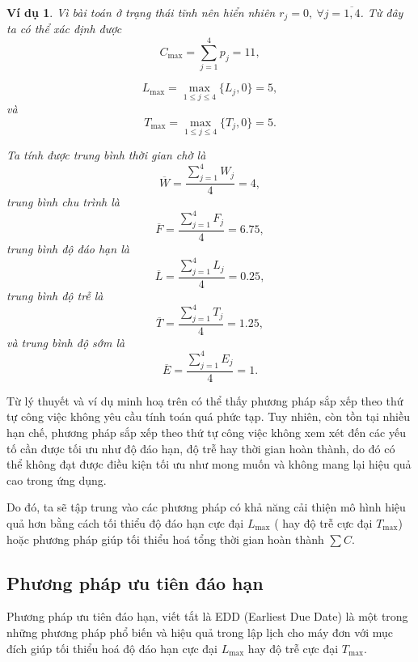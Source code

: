 \documentclass[12pt,a4paper]{report}
\newtheorem{vd}{Ví dụ}
\begin{document}
\begin{vd}
Vì bài toán ở trạng thái tĩnh nên hiển nhiên $r_j = 0, \: \forall j=\overline{1,4}$. Từ đây ta có thể xác định được
\begin{equation*}
C_{\max} = \sum_{j=1}^4 p_j = 11,
\end{equation*}

\begin{equation*}
	L_{\max} = \max _{1 \leq j \leq 4} \{L_j, 0\} = 5,
\end{equation*}
và
\begin{equation*}
	T_{\max} = \max _{1 \leq j \leq 4} \{T_j, 0\} = 5.
\end{equation*}

Ta tính được trung bình thời gian chờ là
\begin{equation*}
\overline{W} = \frac{\sum_{j=1}^4 W_j}{4} = 4,
\end{equation*}
trung bình chu trình là
\begin{equation*}
\overline{F} = \frac{\sum_{j=1}^4 F_j}{4} = 6.75,
\end{equation*}
trung bình độ đáo hạn là
\begin{equation*}
\overline{L} = \frac{\sum_{j=1}^4 L_j}{4} = 0.25,
\end{equation*}
trung bình độ trễ là
\begin{equation*}
\overline{T} = \frac{\sum_{j=1}^4 T_j}{4} = 1.25,
\end{equation*}
và trung bình độ sớm là
\begin{equation*}
\overline{E} = \frac{\sum_{j=1}^4 E_j}{4} = 1.
\end{equation*}
\end{vd}

Từ lý thuyết và ví dụ minh hoạ trên có thể thấy phương pháp sắp xếp theo thứ tự công việc không yêu cầu tính toán quá phức tạp. Tuy nhiên, còn tồn tại nhiều hạn chế, phương pháp sắp xếp theo thứ tự công việc không xem xét đến các yếu tố cần được tối ưu như độ đáo hạn, độ trễ hay thời gian hoàn thành, do đó có thể không đạt được điều kiện tối ưu như mong muốn và không mang lại hiệu quả cao trong ứng dụng.

Do đó, ta sẽ tập trung vào các phương pháp có khả năng cải thiện mô hình hiệu quả hơn bằng cách tối thiểu độ đáo hạn cực đại $L_{\max}$ ( hay độ trễ cực đại $T_{\max}$) hoặc phương pháp giúp tối thiểu hoá tổng thời gian hoàn thành $\sum C$.
\subsection{Phương pháp ưu tiên đáo hạn}
Phương pháp ưu tiên đáo hạn, viết tắt là EDD (Earliest Due Date) là một trong những phương pháp phổ biến và hiệu quả trong lập lịch cho máy đơn với mục đích giúp tối thiểu hoá độ đáo hạn cực đại $L_{\max}$ hay độ trễ cực đại $T_{\max}$.
\end{document}
